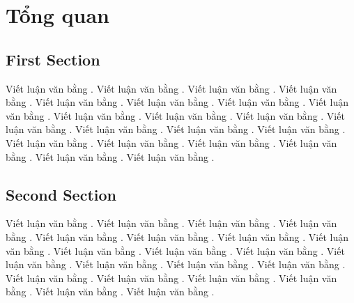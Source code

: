 \chapter{Tổng quan}
\ifpdf
    \graphicspath{{Chapter2/Chapter2Figs/PNG/}{Chapter2/Chapter2Figs/PDF/}{Chapter2/Chapter2Figs/}}
\else
    \graphicspath{{Chapter2/Chapter2Figs/EPS/}{Chapter2/Chapter2Figs/}}
\fi

\section{First Section}
Viết luận văn bằng  . Viết luận văn bằng  . Viết luận văn bằng  . Viết luận văn bằng  . Viết luận văn bằng  . Viết luận văn bằng  . Viết luận văn bằng  . Viết luận văn bằng  . Viết luận văn bằng  . Viết luận văn bằng  . Viết luận văn bằng  . Viết luận văn bằng  . Viết luận văn bằng  . Viết luận văn bằng  . Viết luận văn bằng  . Viết luận văn bằng  . Viết luận văn bằng  . Viết luận văn bằng  . Viết luận văn bằng  . Viết luận văn bằng  . Viết luận văn bằng  . 



\section{Second Section}
Viết luận văn bằng  . Viết luận văn bằng  . Viết luận văn bằng  . Viết luận văn bằng  . Viết luận văn bằng  . Viết luận văn bằng  . Viết luận văn bằng  . Viết luận văn bằng  . Viết luận văn bằng  . Viết luận văn bằng  . Viết luận văn bằng  . Viết luận văn bằng  . Viết luận văn bằng  . Viết luận văn bằng  . Viết luận văn bằng  . Viết luận văn bằng  . Viết luận văn bằng  . Viết luận văn bằng  . Viết luận văn bằng  . Viết luận văn bằng  . Viết luận văn bằng  . 


